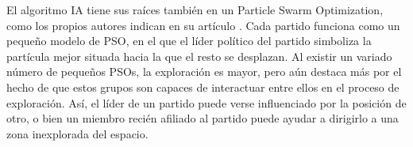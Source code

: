 El algoritmo IA tiene sus raíces también en un Particle Swarm Optimization, como los propios autores indican en su artículo \cite{ia-article}. Cada partido funciona como un pequeño modelo de PSO, en el que el líder político del partido simboliza la partícula mejor situada hacia la que el resto se desplazan. Al existir un variado número de pequeños PSOs, la exploración es mayor, pero aún destaca más por el hecho de que estos grupos son capaces de interactuar entre ellos en el proceso de exploración. Así, el líder de un partido puede verse influenciado por la posición de otro, o bien un miembro recién afiliado al partido puede ayudar a dirigirlo a una zona inexplorada del espacio.